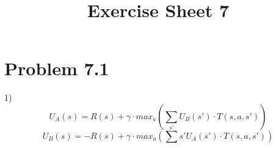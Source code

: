 \documentclass[a4paper]{article}
\title{Exercise Sheet 7}
\begin{document}
\maketitle

\section*{Problem 7.1}
1)
$$U_A(s) = R(s) + \gamma \cdot max_a(\sum_{s'} U_B(s') \cdot T(s,a,s'))$$
$$U_B(s) = -R(s) + \gamma \cdot max_a(\sum{s'} U_A(s') \cdot T(s, a, s'))$$
\end{document}
